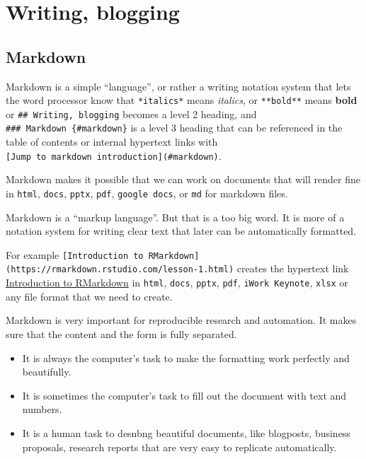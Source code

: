 \documentclass[
  a4paper,
  openany, a4paper, oneside]{book}
\begin{document}
\hypertarget{writing-blogging}{%
\section{Writing, blogging}\label{writing-blogging}}

\hypertarget{markdown}{%
\subsection{Markdown}\label{markdown}}

Markdown is a simple ``language'', or rather a writing notation system that lets the word processor know that \texttt{*italics*} means \emph{italics}, or \texttt{**bold**} means \textbf{bold} or \texttt{\#\#\ Writing,\ blogging} becomes a level 2 heading, and \texttt{\#\#\#\ Markdown\ \{\#markdown\}} is a level 3 heading that can be referenced in the table of contents or internal hypertext links with \texttt{{[}Jump\ to\ markdown\ introduction{]}(\#markdown)}.

Markdown makes it possible that we can work on documents that will render fine in \texttt{html}, \texttt{docs}, \texttt{pptx}, \texttt{pdf}, \texttt{google\ docs}, or \texttt{md} for markdown files.

Markdown is a ``markup language''. But that is a too big word. It is more of a notation system for writing clear text that later can be automatically formatted.

For example \texttt{{[}Introduction\ to\ RMarkdown{]}(https://rmarkdown.rstudio.com/lesson-1.html)} creates the hypertext link \href{https://rmarkdown.rstudio.com/lesson-1.html}{Introduction to RMarkdown} in \texttt{html}, \texttt{docs}, \texttt{pptx}, \texttt{pdf}, \texttt{iWork\ Keynote}, \texttt{xlsx} or any file format that we need to create.

Markdown is very important for reproducible research and automation. It makes sure that the content and the form is fully separated.

\begin{itemize}
\item
  It is always the computer's task to make the formatting work perfectly and beautifully.
\item
  It is sometimes the computer's task to fill out the document with text and numbers.
\item
  It is a human task to desnbng beautiful documents, like blogposts, business proposals, research reports that are very easy to replicate automatically.
\end{itemize}
\end{document}
